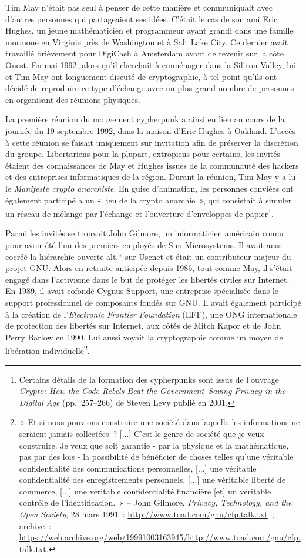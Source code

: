 \documentclass[
  a5paper,
  smalldemyvopaper,10pt,twoside,onecolumn,openright,extrafontsizes,hidelinks]{memoir}
\begin{document}
Tim May n'était pas seul à penser de cette manière et communiquait avec
d'autres personnes qui partageaient ses idées. C'était le cas de son ami
Eric Hughes, un jeune mathématicien et programmeur ayant grandi dans une
famille mormone en Virginie près de Washington et à Salt Lake City. Ce
dernier avait travaillé brièvement pour DigiCash à Amsterdam avant de
revenir sur la côte Ouest. En mai 1992, alors qu'il cherchait à
emménager dans la Silicon Valley, lui et Tim May ont longuement discuté
de cryptographie, à tel point qu'ils ont décidé de reproduire ce type
d'échange avec un plus grand nombre de personnes en organisant des
réunions physiques.

La première réunion du mouvement cypherpunk a ainsi eu lieu au cours de
la journée du 19 septembre 1992, dans la maison d'Eric Hughes à Oakland.
L'accès à cette réunion se faisait uniquement sur invitation afin de
préserver la discrétion du groupe. Libertariens pour la plupart,
extropiens pour certains, les invités étaient des connaissances de May
et Hughes issues de la communauté des hackers et des entreprises
informatiques de la région. Durant la réunion, Tim May y a lu le
\emph{Manifeste crypto anarchiste}. En guise d'animation, les personnes
conviées ont également participé à un «~jeu de la crypto anarchie~», qui
consistait à simuler un réseau de mélange par l'échange et l'ouverture
d'enveloppes de papier\footnote{Certains détails de la formation des
  cypherpunks sont issus de l'ouvrage \emph{Crypto: How the Code Rebels
  Beat the Government--Saving Privacy in the Digital Age} (pp.~257--266)
  de Steven Levy publié en 2001.}.

Parmi les invités se trouvait John Gilmore, un informaticien américain
connu pour avoir été l'un des premiers employés de Sun Microsystems. Il
avait aussi cocréé la hiérarchie ouverte alt.* sur Usenet et était un
contributeur majeur du projet GNU. Alors en retraite anticipée depuis
1986, tout comme May, il s'était engagé dans l'activisme dans le but de
protéger les libertés civiles sur Internet. En 1989, il avait cofondé
Cygnus Support, une entreprise spécialisée dans le support professionnel
de composants fondés sur GNU. Il avait également participé à la création
de l'\emph{Electronic Frontier Foundation} (EFF), une ONG internationale
de protection des libertés sur Internet, aux côtés de Mitch Kapor et de
John Perry Barlow en 1990. Lui aussi voyait la cryptographie comme un
moyen de libération individuelle\footnote{«~Et si nous pouvions
  construire une société dans laquelle les informations ne seraient
  jamais collectées~? {[}...{]} C'est le genre de société que je veux
  construire. Je veux que soit garantie - par la physique et la
  mathématique, pas par des lois - la possibilité de bénéficier de
  choses telles qu'une véritable confidentialité des communications
  personnelles, {[}...{]} une véritable confidentialité des
  enregistrements personnels, {[}...{]} une véritable liberté de
  commerce, {[}...{]} une véritable confidentialité financière {[}et{]}
  un véritable contrôle de l'identification.~» -- John Gilmore,
  \emph{Privacy, Technology, and the Open Society}, 28 mars 1991~:
  \url{http://www.toad.com/gnu/cfp.talk.txt}~; archive~:
  \url{https://web.archive.org/web/19991003163945/http://www.toad.com/gnu/cfp.talk.txt}.}.
\end{document}
